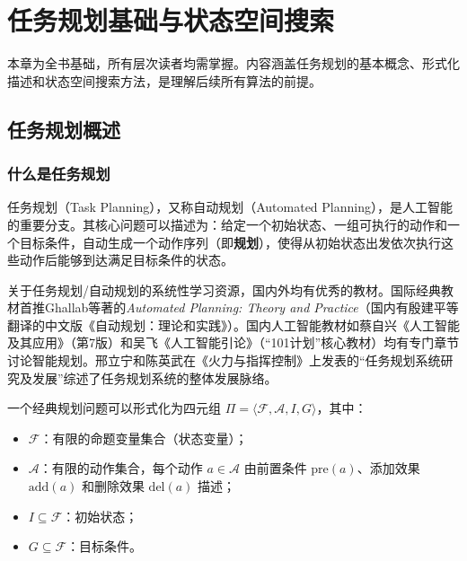 \chapter{任务规划基础与状态空间搜索 \ug}

\begin{levelbox}
本章为全书基础，所有层次读者均需掌握。内容涵盖任务规划的基本概念、形式化描述和状态空间搜索方法，是理解后续所有算法的前提。
\end{levelbox}

\section{任务规划概述}

\subsection{什么是任务规划}

任务规划（Task Planning），又称自动规划（Automated Planning），是人工智能的重要分支。其核心问题可以描述为：给定一个初始状态、一组可执行的动作和一个目标条件，自动生成一个动作序列（即\textbf{规划}），使得从初始状态出发依次执行这些动作后能够到达满足目标条件的状态。

\begin{remark}
关于任务规划/自动规划的系统性学习资源，国内外均有优秀的教材。国际经典教材首推Ghallab等著的\emph{Automated Planning: Theory and Practice}（国内有殷建平等翻译的中文版《自动规划：理论和实践》）。国内人工智能教材如蔡自兴《人工智能及其应用》（第7版）和吴飞《人工智能引论》（``101计划''核心教材）均有专门章节讨论智能规划。邢立宁和陈英武在《火力与指挥控制》上发表的``任务规划系统研究及发展''综述了任务规划系统的整体发展脉络。
\end{remark}

\begin{definition}[经典规划问题]
一个经典规划问题可以形式化为四元组 $\Pi = \langle \mathcal{F}, \mathcal{A}, I, G \rangle$，其中：
\begin{itemize}
  \item $\mathcal{F}$：有限的命题变量集合（状态变量）；
  \item $\mathcal{A}$：有限的动作集合，每个动作 $a \in \mathcal{A}$ 由前置条件 $\mathrm{pre}(a)$、添加效果 $\mathrm{add}(a)$ 和删除效果 $\mathrm{del}(a)$ 描述；
  \item $I \subseteq \mathcal{F}$：初始状态；
  \item $G \subseteq \mathcal{F}$：目标条件。
\end{itemize}
\end{definition}

